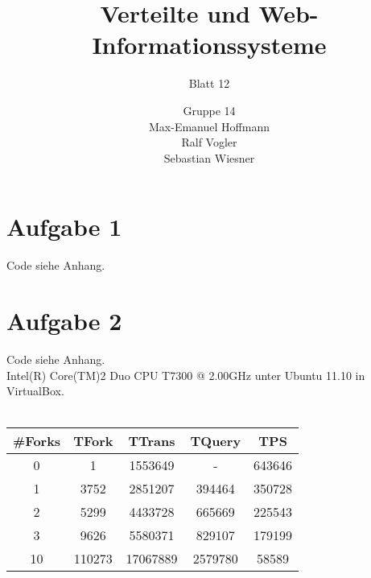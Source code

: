 \documentclass[11pt,a4paper]{scrartcl}
\begin{document}
\author{Gruppe 14\\Max-Emanuel Hoffmann\\Ralf Vogler\\Sebastian Wiesner}
\title{Verteilte und Web-Informationssysteme}
\subtitle{Blatt 12}

\maketitle

\section*{Aufgabe 1}
Code siehe Anhang.

\section*{Aufgabe 2}
Code siehe Anhang.\\
Intel(R) Core(TM)2 Duo CPU     T7300  @ 2.00GHz unter Ubuntu 11.10 in VirtualBox.\\
\\
\begin{tabular}{ccccc}
  \#Forks & TFork & TTrans & TQuery & TPS\\
  \hline
  0 & 1 & 1553649 & - & 643646 \\
  1 & 3752 & 2851207 & 394464 & 350728 \\
  2 & 5299 & 4433728 & 665669 & 225543 \\
  3 & 9626 & 5580371 & 829107 & 179199 \\
  10 & 110273 & 17067889 & 2579780 & 58589 \\
\end{tabular}
\end{document}
